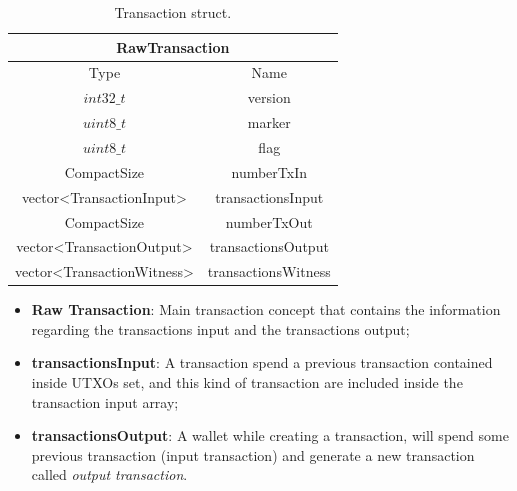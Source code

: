 \begin{table}[H]
    \centering\small
       \begin{tabular}{|c|c|}
        \hline
        \multicolumn{2}{|c|}{\textbf{RawTransaction}} \\
        \hline
        \multicolumn{1}{|c|}{Type} & \multicolumn{1}{c|}{Name} \\       
        \hline \hline
        $int32\_t$ & version   \\
        \hline
        $uint8\_t$ & marker \\
        \hline
        $uint8\_t$ & flag \\
        \hline
        CompactSize & numberTxIn \\
        \hline
        vector<TransactionInput> & transactionsInput \\
        \hline
        CompactSize & numberTxOut \\
        \hline
        vector<TransactionOutput> & transactionsOutput \\
        \hline
        vector<TransactionWitness> & transactionsWitness \\
        \hline
    \end{tabular}   
    \caption{Transaction struct\cite{Palazzo_Estrazione_di_Informazioni_2021}.\label{tab:rawtxbitcoinc}}
\end{table}

\begin{itemize}
    \item {\bf Raw Transaction}: Main transaction concept that contains the information
        regarding the transactions input and the transactions output;
    \item {\bf transactionsInput}: A transaction spend a previous transaction contained
        inside UTXOs set, and this kind of transaction are included inside
        the transaction input array;
    \item {\bf transactionsOutput}: A wallet while creating a transaction, will spend some previous
        transaction (input transaction) and generate a new transaction called \emph{output transaction}.
\end{itemize}



